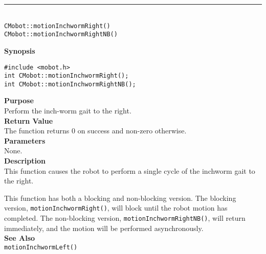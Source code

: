 \noindent
\vspace{5pt}
\rule{4.5in}{0.015in}\\
\noindent
{\LARGE \texttt{CMobot::motionInchwormRight()}}\\
{\LARGE \texttt{CMobot::motionInchwormRightNB()}}\\
{}

\noindent
{\bf Synopsis}
\begin{verbatim}
#include <mobot.h>
int CMobot::motionInchwormRight();
int CMobot::motionInchwormRightNB();
\end{verbatim}

\noindent
{\bf Purpose}\\
Perform the inch-worm gait to the right.\\

\noindent
{\bf Return Value}\\
The function returns 0 on success and non-zero otherwise.\\

\noindent
{\bf Parameters}\\
None.\\

\noindent
{\bf Description}\\
This function causes the robot to perform a single cycle of the inchworm gait
to the right. 

This function has both a blocking and non-blocking version.
The blocking version, \texttt{motionInchwormRight()}, will block until the
robot motion has completed. The non-blocking version, \texttt{motionInchwormRightNB()},
will return immediately, and the motion will be performed asynchronously.\\

\noindent
{\bf See Also}\\
\texttt{motionInchwormLeft()}

